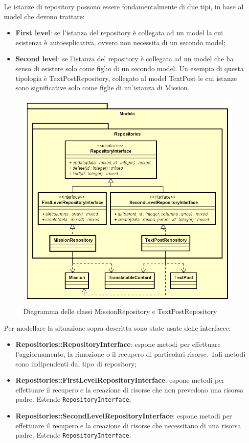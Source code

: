 Le istanze di repository possono essere fondamentalmente di due tipi, in base al model che devono trattare:
\begin{itemize}
	\item \textbf{First level}: se l'istanza del repository è collegata ad un model la cui esistenza è autoesplicativa, ovvero non necessita di un secondo model; 
	\item \textbf{Second level}: se l'istanza del repository è collegata ad un model che ha senso di esistere solo come figlio di un secondo model. Un esempio di questa tipologia è TextPostRepository, collegato al model TextPost le cui istanze sono significative solo come figlie di un'istanza di Mission.
\end{itemize}

\begin{figure}[H]
	\centering
  \includegraphics[scale=0.7]{immagini/components/repository_example.png}
  \caption{Diagramma delle classi MissionRepository e TextPostRepository}
	\label{fig:repository-example} 
\end{figure}

\newpage
Per modellare la situazione sopra descritta sono state usate delle interfacce:
\begin{itemize}
	\item \textbf{Repositories::RepositoryInterface}: espone metodi per effettuare l'aggiornamento, la rimozione o il recupero di particolari risorse. Tali metodi sono indipendenti dal tipo di repository;
	\item \textbf{Repositories::FirstLevelRepositoryInterface}: espone metodi per effettuare il recupero e la creazione di risorse che non prevedono una risorsa padre. Estende \verb!RepositoryInterface!;
	\item \textbf{Repositories::SecondLevelRepositoryInterface}: espone metodi per effettuare il recupero e la creazione di risorse che necessitano di una risorsa padre. Estende \verb!RepositoryInterface!.
\end{itemize}

